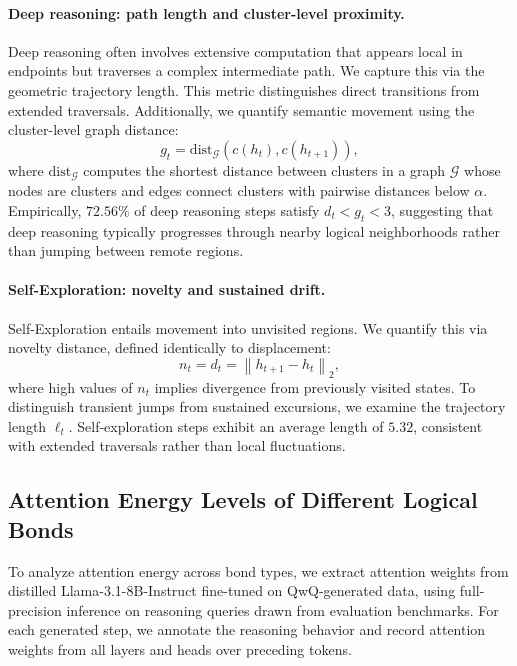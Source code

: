 \paragraph{\textbf{Deep reasoning: path length and cluster-level proximity.}}
Deep reasoning often involves extensive computation that appears local in endpoints but traverses a complex intermediate path. We capture this via the {geometric trajectory length}. 
This metric distinguishes direct transitions from extended traversals. Additionally, we quantify semantic movement using the {cluster-level graph distance}:
\begin{equation}
  g_t = \mathrm{dist}_{\mathcal{G}} \left(c(h_t), c(h_{t+1})\right),
\end{equation}
where \(\mathrm{dist}_{\mathcal{G}}\) computes the shortest distance between clusters in a graph \(\mathcal{G}\) whose nodes are clusters and edges connect clusters with pairwise distances below \(\alpha\).
Empirically, \(72.56\%\) of deep reasoning steps satisfy \(d_t < g_t < 3\), suggesting that deep reasoning typically progresses through nearby logical neighborhoods rather than jumping between remote regions.\vspace{-5pt}

\paragraph{\textbf{Self-Exploration: novelty and sustained drift.}}
Self-Exploration entails movement into unvisited regions. We quantify this via {novelty distance}, defined identically to displacement:
\begin{equation}
  n_t = d_t = \left\lVert h_{t+1} - h_t \right\rVert_2,
\end{equation}
where high values of \(n_t\) implies divergence from previously visited states. To distinguish transient jumps from sustained excursions, we examine the trajectory length \(\ell_t\). Self-exploration steps exhibit an average length of \(5.32\), consistent with extended traversals rather than local fluctuations.


\subsection{Attention Energy Levels of Different Logical Bonds}
\label{append:attention}

To analyze attention energy across bond types, we extract attention weights from distilled Llama-3.1-8B-Instruct fine-tuned on QwQ-generated data, using full-precision inference on reasoning queries drawn from evaluation benchmarks. For each generated step, we annotate the reasoning behavior and record attention weights from all layers and heads over preceding tokens.


